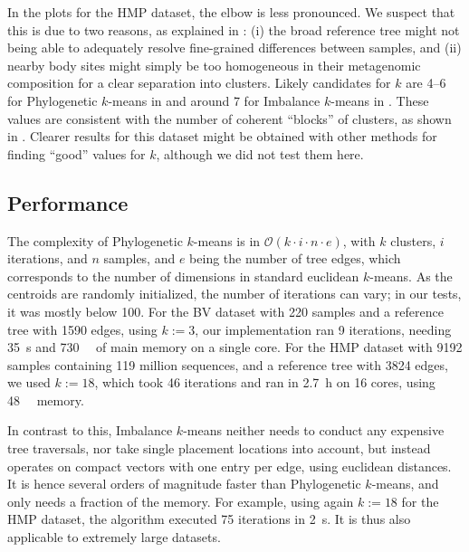 In the plots for the \ac{HMP} dataset, the elbow is less pronounced.
We suspect that this is due to two reasons, as explained in :
(i) the broad reference tree might not being able to adequately resolve fine-grained differences between samples,
and (ii) nearby body sites might simply be too homogeneous in their metagenomic composition for a clear separation into clusters.
Likely candidates for $k$ are \num{4}--\num{6} for Phylogenetic $k$-means in 
and around \num{7} for Imbalance $k$-means in .
These values are consistent with the number of coherent ``blocks'' of clusters,
as shown in .
Clearer results for this dataset might be obtained with other methods for finding ``good'' values for $k$,
although we did not test them here.


\subsection{Performance}
\label{ch:Clustering:sec:Results:sub:Performance}

The complexity of Phylogenetic $k$-means is in $\mathcal{O}(k \cdot i \cdot n \cdot e)$,
with $k$ clusters, $i$ iterations, and $n$ samples, and $e$ being the number of tree edges,
which corresponds to the number of dimensions in standard euclidean $k$-means.
As the centroids are randomly initialized, the number of iterations can vary;
in our tests, it was mostly below \num{100}.
For the \ac{BV} dataset with \num{220} samples and a reference tree with \num{1 590} edges, using $k:=3$,
our implementation ran \num{9} iterations, needing \SI{35}{\second} and \SI{730}{\mega\byte} of main memory on a single core.
For the \ac{HMP} dataset with \num{9 192} samples containing \num{119} million sequences,
and a reference tree with \num{3 824} edges, we used $k:=18$,
which took \num{46} iterations and ran in \SI{2.7}{\hour} on \num{16} cores, using \SI{48}{\giga\byte} memory.

In contrast to this, Imbalance $k$-means neither needs to conduct any expensive tree traversals,
nor take single placement locations into account,
but instead operates on compact vectors with one entry per edge, using euclidean distances.
It is hence several orders of magnitude faster than Phylogenetic $k$-means, and only needs a fraction of the memory.
For example, using again $k:=18$ for the \ac{HMP} dataset,
the algorithm executed \num{75} iterations in \SI{2}{\second}.
It is thus also applicable to extremely large datasets.

